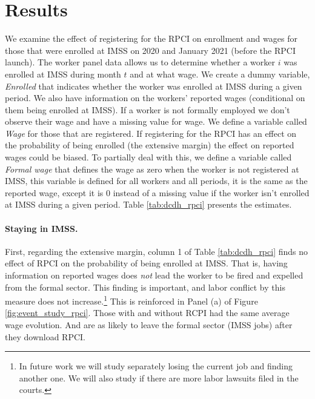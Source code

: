 \documentclass[oneside,11pt]{article}
\begin{document}

\section{Results} \label{results}

We examine the effect of registering for the RPCI on enrollment and wages for those that were enrolled at IMSS on 2020 and January 2021 (before the RPCI launch). The worker panel data allows us to determine whether a worker $i$ was enrolled at IMSS during month $t$ and at what wage. We create a dummy variable, \textit{Enrolled} that indicates whether the worker was enrolled at IMSS during a given period. We also have information on the workers' reported wages (conditional on them being enrolled at IMSS). If a worker is not formally employed we don't observe their wage and have a missing value for wage. We define a variable called \textit{Wage} for those that are registered. If registering for the RPCI has an effect on the probability of being enrolled (the extensive margin) the effect on reported wages could be biased. To partially deal with this, we define a variable called \textit{Formal wage} that defines the wage as zero when the worker is not registered at IMSS, this variable is defined for all workers and all periods, it is the same as the reported wage, except it is 0 instead of a missing value if the worker isn't enrolled at IMSS during a given period. Table \ref{tab:dcdh_rpci} presents the estimates. 

\paragraph{Staying in IMSS.} First, regarding the extensive margin, column 1 of Table \ref{tab:dcdh_rpci} finds no effect of RPCI on the probability of being enrolled at IMSS. That is, having information on reported wages does \textit{not} lead the worker to be fired and expelled from the formal sector. This finding is important, and labor conflict by this measure does not increase.\footnote{In future work we will study separately losing the current job and finding another one. We will also study if there are more labor lawsuits filed in the courts.} This is reinforced in Panel (a) of Figure \ref{fig:event_study_rpci}. Those with and without RCPI had the same average wage evolution. And are as likely to leave the formal sector (IMSS jobs) after they download RPCI.
\end{document}
